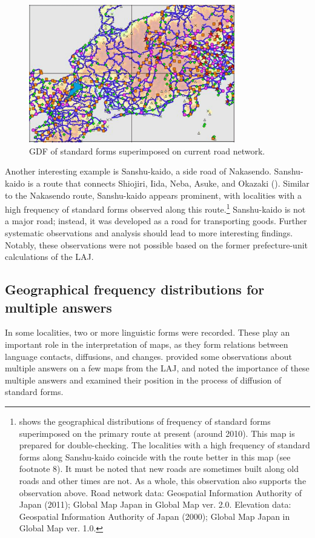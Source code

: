 \documentclass[output=paper]{LSP/langsci}
\begin{document}
\begin{figure}
\includegraphics[width=0.8\textwidth]{illustrations/kuma_fig13}
\caption{GDF of standard forms superimposed on current road network.}          
\label{fig:13}
\end{figure}

Another interesting example is Sanshu-kaido, a side road of Nakasendo. Sanshu-kaido is a route that connects Shiojiri, Iida, Neba, Asuke, and Okazaki (). Similar to the Nakasendo route, Sanshu-kaido appears prominent, with localities with a high frequency of standard forms observed along this route.\footnote{ shows the geographical distributions of frequency of standard forms superimposed on the primary route at present (around 2010). This map is prepared for double-checking. The localities with a high frequency of standard forms along Sanshu-kaido coincide with the route better in this map (see footnote 8). It must be noted that new roads are sometimes built along old roads and other times are not. As a whole, this observation also supports the observation above. Road network data: Geospatial Information Authority of Japan (2011); Global Map Japan in Global Map ver. 2.0. Elevation data: Geospatial Information Authority of Japan (2000); Global Map Japan in Global Map ver. 1.0.} Sanshu-kaido is not a major road; instead, it was developed as a road for transporting goods. Further systematic observations and analysis should lead to more interesting findings. Notably, these observations were not possible based on the former prefecture-unit calculations of the LAJ.

\subsection{Geographical frequency distributions for multiple answers}
In some localities, two or more linguistic forms were recorded. These  play an important role in the interpretation of maps, as they form relations between language contacts, diffusions, and changes. \citet{inagaki_hogen_1980} provided some observations about multiple answers on a few maps from the LAJ, and \citet{inoue_heiyo_2004} noted the importance of these multiple answers and examined their position in the process of diffusion of standard forms.
\end{document}
